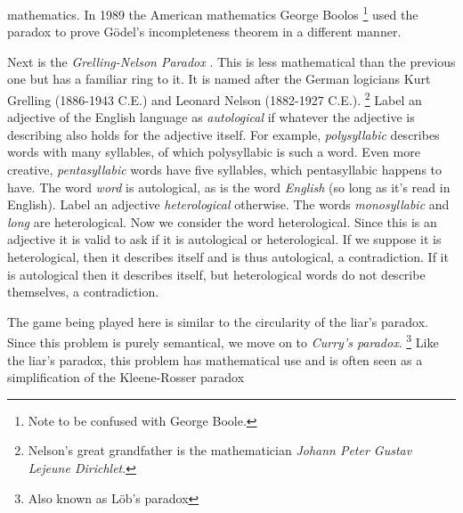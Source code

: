         mathematics. In 1989 the American mathematics George
        Boolos%
        \footnote{Note to be confused with George Boole.}
        used the paradox to prove G\"{o}del's incompleteness theorem in a
        different manner.
        \par\hfill\par
        Next is the \textit{Grelling-Nelson Paradox}%
        . This is
        less mathematical than the previous one but has a familiar ring to it.
        It is named after the German logicians Kurt
        Grelling (1886-1943 C.E.) and Leonard
        Nelson (1882-1927 C.E.).%
        \footnote{%
            Nelson's great grandfather is the mathematician
            \textit{Johann Peter Gustav Lejeune Dirichlet}.%
        }
        Label an adjective of the English language as \textit{autological} if
        whatever the adjective is describing also holds for the adjective
        itself. For example, \textit{polysyllabic} describes words with many
        syllables, of which polysyllabic is such a word. Even more creative,
        \textit{pentasyllabic} words have five syllables, which pentasyllabic
        happens to have. The word \textit{word} is autological, as is the word
        \textit{English} (so long as it's read in English). Label an adjective
        \textit{heterological} otherwise. The words \textit{monosyllabic} and
        \textit{long} are heterological. Now we consider the word heterological.
        Since this is an adjective it is valid to ask if it is autological or
        heterological. If we suppose it is heterological, then it describes
        itself and is thus autological, a contradiction. If it is autological
        then it describes itself, but heterological words do not describe
        themselves, a contradiction.
        \par\hfill\par
        The game  being played here is similar to the circularity of the
        liar's paradox. Since this problem is purely semantical, we move on to
        \textit{Curry's paradox}.%
        \footnote{%
            Also known as L\"{o}b's paradox%
        }
        Like the liar's paradox, this problem has mathematical use and is often
        seen as a simplification of the Kleene-Rosser paradox%
